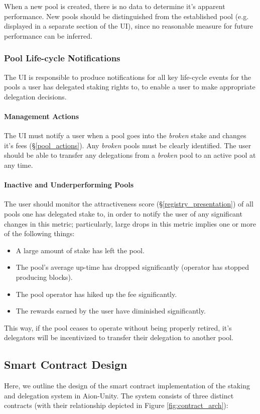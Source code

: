 When a new pool is created, there is no data to determine it's apparent performance. New pools should be distinguished from the established pool (e.g. displayed in a separate section of the UI), since no reasonable measure for future performance can be inferred. 

\subsubsection{Pool Life-cycle Notifications}
The UI is responsible to produce notifications for all key life-cycle events for the pools a user has delegated staking rights to, to enable a user to make appropriate delegation decisions. 

\paragraph{Management Actions}
The UI must notify a user when a pool goes into the \textit{broken} stake and changes it's fees (\S\ref{pool_actions}). Any \textit{broken} pools must be clearly identified. The user should be able to transfer any delegations from a \textit{broken}  pool to an active pool at any time. 

\paragraph{Inactive and Underperforming Pools}
The user should monitor the attractiveness score (\S\ref{registry_presentation}) of all pools one has delegated stake to, in order to notify the user of any significant changes in this metric; particularly, large drops in this metric implies one or more of the following things: 
\begin{itemize}[label=--,nosep]
    \item A large amount of stake has left the pool.
    \item The pool's average up-time has dropped significantly (operator has stopped producing blocks). 
    \item The pool operator has hiked up the fee significantly. 
    \item The rewards earned by the user have diminished significantly. 
\end{itemize}

This way, if the pool ceases to operate without being properly retired, it's delegators will be incentivized to transfer their delegation to another pool. 

\clearpage
\subsection{Smart Contract Design} \label{sc_design}
Here, we outline the design of the smart contract implementation of the staking and delegation system in Aion-Unity. The system consists of three distinct contracts (with their relationship depicted in Figure \ref{fig:contract_arch}):

